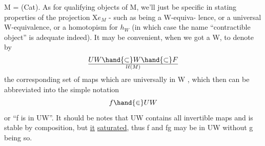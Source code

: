 M = (Cat). As for qualifying objects of M, we'll just be specific in
stating properties of the projection X\hand{$\to$}$e_{M}$ - such as being a W-equiva-%
lence, or a universal W-equivalence, or a homotopism for $h_{W}$ (in which
case the name ``contractible object'' is adequate indeed). It may be
convenient, when we got a W, to denote by 
\[ UW \hand{\subset} W \hand{\subset} F\over{l}{\ell}(M) \]
the corresponding set of maps which are universally in W ,  which then
can be abbreviated into the simple notation
\[ f \hand{\in} UW \]
or ``f is in UW''. It should be notes that UW contains all invertible
maps and is stable by composition, but \uline{it}  \uline{saturated}, thus f and 
fg may be in UW without g being so.

